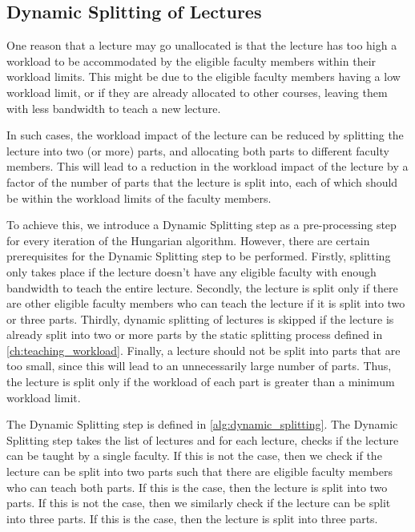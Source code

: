 \subsection{Dynamic Splitting of Lectures}
\label{sec:dynamic_splitting}

One reason that a lecture may go unallocated is that the lecture has too high a workload to be accommodated by the eligible faculty members within their workload limits. This might be due to the eligible faculty members having a low workload limit, or if they are already allocated to other courses, leaving them with less bandwidth to teach a new lecture.

In such cases, the workload impact of the lecture can be reduced by splitting the lecture into two (or more) parts, and allocating both parts to different faculty members. This will lead to a reduction in the workload impact of the lecture by a factor of the number of parts that the lecture is split into, each of which should be within the workload limits of the faculty members.

To achieve this, we introduce a Dynamic Splitting step as a pre-processing step for every iteration of the Hungarian algorithm. However, there are certain prerequisites for the Dynamic Splitting step to be performed. Firstly, splitting only takes place if the lecture doesn't have any eligible faculty with enough bandwidth to teach the entire lecture. Secondly, the lecture is split only if there are other eligible faculty members who can teach the lecture if it is split into two or three parts. Thirdly, dynamic splitting of lectures is skipped if the lecture is already split into two or more parts by the static splitting process defined in \autoref{ch:teaching_workload}. Finally, a lecture should not be split into parts that are too small, since this will lead to an unnecessarily large number of parts. Thus, the lecture is split only if the workload of each part is greater than a minimum workload limit.

The Dynamic Splitting step is defined in \autoref{alg:dynamic_splitting}. The Dynamic Splitting step takes the list of lectures and for each lecture, checks if the lecture can be taught by a single faculty. If this is not the case, then we check if the lecture can be split into two parts such that there are eligible faculty members who can teach both parts. If this is the case, then the lecture is split into two parts. If this is not the case, then we similarly check if the lecture can be split into three parts. If this is the case, then the lecture is split into three parts.

